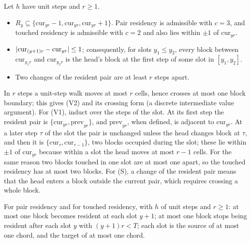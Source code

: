 \begin{lemma}[Residency]\label{lem:residency}
Let $h$ have unit steps and $r\ge1$.
\begin{itemize}[leftmargin=3em]
\item[(V1)] $R_y\subseteq\{\mathrm{cur}_{yr}-1,\mathrm{cur}_{yr},\mathrm{cur}_{yr}+1\}$. Pair residency
is admissible with $c=3$, and touched residency is admissible with $c=2$ and also lies within
$\pm1$ of $\mathrm{cur}_{yr}$.
\item[(V2)] $\lvert \mathrm{cur}_{(y+1)r}-\mathrm{cur}_{yr} \rvert\le1$; consequently, for slots
$y_1\le y_2$, every block between $\mathrm{cur}_{y_1r}$ and $\mathrm{cur}_{y_2r}$ is the head's
block at the first step of some slot in $[y_1,y_2]$.
\item[(S)] Two changes of the resident pair are at least $r$ steps apart.
\end{itemize}
\end{lemma}

\begin{outline}
In $r$ steps a unit-step walk moves at most $r$ cells, hence crosses at most one block
boundary; this gives (V2) and its crossing form (a discrete intermediate value argument). For (V1), induct over the steps of the slot. At its first step the resident pair is
$\{\mathrm{cur}_{yr},\mathrm{prev}_{yr}\}$, and $\mathrm{prev}_{yr}$, when defined, is adjacent to
$\mathrm{cur}_{yr}$. At a later step $\tau$ of the slot the pair is unchanged unless the head changes
block at $\tau$, and then it is $\{\mathrm{cur}_\tau,\mathrm{cur}_{\tau-1}\}$, two blocks occupied
during the slot; these lie within $\pm1$ of $\mathrm{cur}_{yr}$ because within a slot the head moves
at most $r-1$ cells. For the same reason two blocks touched in one slot are at most one apart, so the
touched residency has at most two blocks. For (S), a change of the resident pair means that the head
enters a block outside the current pair, which requires crossing a whole block.
\end{outline}

\begin{lemma}\label{lem:P2}
For pair residency and for touched residency, with $h$ of unit steps and $r\ge1$:
at most one block becomes resident at each slot $y+1$; at most one block stops being resident
after each slot $y$ with $(y+1)r<T$; each slot is the source of at most one chord, and the target
of at most one chord.
\end{lemma}

